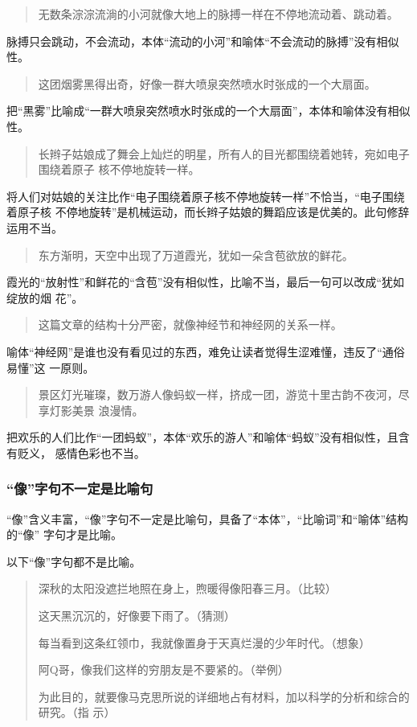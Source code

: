 \documentclass[final,oneside]{ctexbook}
\newenvironment{equotation}{\begin{quotation}\kaishu}{\end{quotation}}
\begin{document}
\begin{equotation}
  无数条淙淙流淌的小河就像大地上的脉搏一样在不停地流动着、跳动着。
\end{equotation}
脉搏只会跳动，不会流动，本体“流动的小河”和喻体“不会流动的脉搏”没有相似性。

\begin{equotation}
  这团烟雾黑得出奇，好像一群大喷泉突然喷水时张成的一个大扇面。
\end{equotation}
把“黑雾”比喻成“一群大喷泉突然喷水时张成的一个大扇面”，本体和喻体没有相似性。

\begin{equotation}
  长辫子姑娘成了舞会上灿烂的明星，所有人的目光都围绕着她转，宛如电子围绕着原子
  核不停地旋转一样。
\end{equotation}
将人们对姑娘的关注比作“电子围绕着原子核不停地旋转一样”不恰当，“电子围绕着原子核
不停地旋转”是机械运动，而长辫子姑娘的舞蹈应该是优美的。此句修辞运用不当。

\begin{equotation}
  东方渐明，天空中出现了万道霞光，犹如一朵含苞欲放的鲜花。
\end{equotation}
霞光的“放射性”和鲜花的“含苞”没有相似性，比喻不当，最后一句可以改成“犹如绽放的烟
花”。

\begin{equotation}
  这篇文章的结构十分严密，就像神经节和神经网的关系一样。
\end{equotation}
喻体“神经网”是谁也没有看见过的东西，难免让读者觉得生涩难懂，违反了“通俗易懂”这
一原则。

\begin{equotation}
  景区灯光璀璨，数万游人像蚂蚁一样，挤成一团，游览十里古韵不夜河，尽享灯影美景
  浪漫情。
\end{equotation}
把欢乐的人们比作“一团蚂蚁”，本体“欢乐的游人”和喻体“蚂蚁”没有相似性，且含有贬义，
感情色彩也不当。

\subsubsection{“像”字句不一定是比喻句}

“像”含义丰富，“像”字句不一定是比喻句，具备了“本体”，“比喻词”和“喻体”结构的“像”
字句才是比喻。

以下“像”字句都不是比喻。
\begin{equotation}
  深秋的太阳没遮拦地照在身上，煦暖得像阳春三月。（比较）

  这天黑沉沉的，好像要下雨了。（猜测）

  每当看到这条红领巾，我就像置身于天真烂漫的少年时代。（想象）

  阿Q哥，像我们这样的穷朋友是不要紧的。（举例）

  为此目的，就要像马克思所说的详细地占有材料，加以科学的分析和综合的研究。（指
  示）
\end{equotation}
\end{document}
